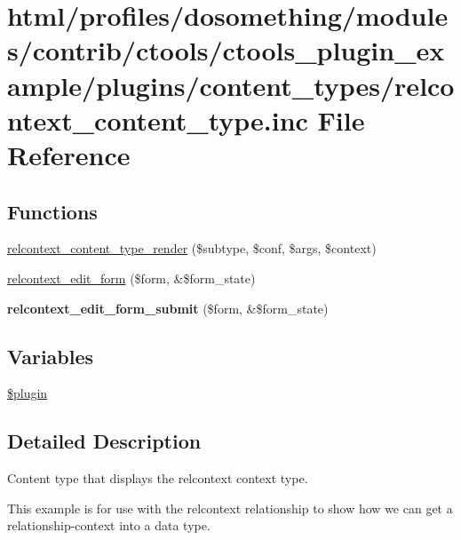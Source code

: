 \hypertarget{relcontext__content__type_8inc}{
\section{html/profiles/dosomething/modules/contrib/ctools/ctools\_\-plugin\_\-example/plugins/content\_\-types/relcontext\_\-content\_\-type.inc File Reference}
\label{relcontext__content__type_8inc}
}
\subsection*{Functions}
\begin{DoxyCompactItemize}
\item 
\hyperlink{relcontext__content__type_8inc_a690d16d488d0c123271bf95a68e57a9a}{relcontext\_\-content\_\-type\_\-render} (\$subtype, \$conf, \$args, \$context)
\item 
\hyperlink{relcontext__content__type_8inc_adabdf26f4d7d168d989ccce9e0899fde}{relcontext\_\-edit\_\-form} (\$form, \&\$form\_\-state)
\item 
\hypertarget{relcontext__content__type_8inc_a7e0be40b5c014d3f8c7c1c2779a26c49}{
{\bfseries relcontext\_\-edit\_\-form\_\-submit} (\$form, \&\$form\_\-state)}
\label{relcontext__content__type_8inc_a7e0be40b5c014d3f8c7c1c2779a26c49}

\end{DoxyCompactItemize}
\subsection*{Variables}
\begin{DoxyCompactItemize}
\item 
\hyperlink{relcontext__content__type_8inc_ada8a7130088351710bb02ed622d6bf65}{\$plugin}
\end{DoxyCompactItemize}


\subsection{Detailed Description}
Content type that displays the relcontext context type.

This example is for use with the relcontext relationship to show how we can get a relationship-\/context into a data type. 

